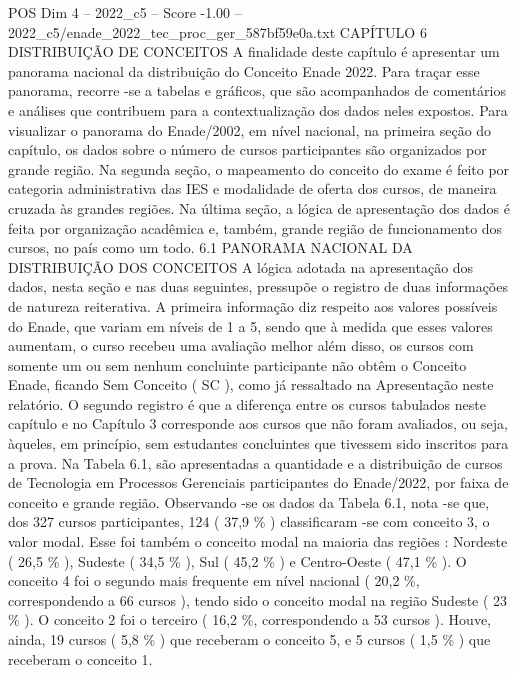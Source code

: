 \begin{textsample}{POS Dim 4 – 2022\_c5 – Score -1.00 – 2022\_c5/enade\_2022\_tec\_proc\_ger\_587bf59e0a.txt}  \label{ex:f4_pos_280}
CAPÍTULO 6 DISTRIBUIÇÃO DE CONCEITOS A finalidade deste capítulo é apresentar um panorama nacional da distribuição do Conceito Enade 2022.
Para traçar esse panorama, recorre -se a tabelas e gráficos, que são acompanhados de comentários e análises que contribuem para a contextualização dos dados neles expostos.
Para visualizar o panorama do Enade/2002, em nível nacional, na primeira seção do capítulo, os dados sobre o número de cursos participantes são organizados por grande região.
Na segunda seção, o mapeamento do conceito do exame é feito por categoria administrativa das IES e modalidade de oferta dos cursos, de maneira cruzada às grandes regiões.
Na última seção, a lógica de apresentação dos dados é feita por organização acadêmica e, também, grande região de funcionamento dos cursos, no país como um todo. 6.1 PANORAMA NACIONAL DA DISTRIBUIÇÃO DOS CONCEITOS A lógica adotada na apresentação dos dados, nesta seção e nas duas seguintes, pressupõe o registro de duas informações de natureza reiterativa.
A primeira informação diz respeito aos valores possíveis do Enade, que variam em níveis de 1 a 5, sendo que à medida que esses valores aumentam, o curso recebeu uma avaliação melhor além disso, os cursos com somente um ou sem nenhum concluinte participante não obtêm o Conceito Enade, ficando Sem Conceito ( SC ), como já ressaltado na Apresentação neste relatório.
O segundo registro é que a diferença entre os cursos tabulados neste capítulo e no Capítulo 3 corresponde aos cursos que não foram avaliados, ou seja, àqueles, em princípio, sem estudantes concluintes que tivessem sido inscritos para a prova.
Na Tabela 6.1, são apresentadas a quantidade e a distribuição de cursos de Tecnologia em Processos Gerenciais participantes do Enade/2022, por faixa de conceito e grande região.
Observando -se os dados da Tabela 6.1, nota -se que, dos 327 cursos participantes, 124 ( 37,9 \% ) classificaram -se com conceito 3, o valor modal.
Esse foi também o conceito modal na maioria das regiões : Nordeste ( 26,5 \% ), Sudeste ( 34,5 \% ), Sul ( 45,2 \% ) e Centro-Oeste ( 47,1 \% ).
O conceito 4 foi o segundo mais frequente em nível nacional ( 20,2 \%, correspondendo a 66 cursos ), tendo sido o conceito modal na região Sudeste ( 23 \% ).
O conceito 2 foi o terceiro ( 16,2 \%, correspondendo a 53 cursos ).
Houve, ainda, 19 cursos ( 5,8 \% ) que receberam o conceito 5, e 5 cursos ( 1,5 \% ) que receberam o conceito 1.

\end{textsample}
